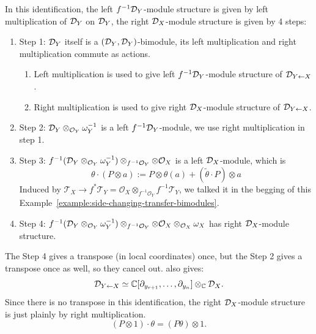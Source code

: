 \begin{example}
\begin{enumerate}
              In this identification, the left $f^{-1}\mathcal{D}_Y$-module structure is given by left multiplication of $\mathcal{D}_Y$ on $\mathcal{D}_Y$, the right $\mathcal{D}_X$-module structure is given by 4 steps:
              \begin{enumerate}
                  \item Step 1: $\mathcal{D}_Y$ itself is a $(\mathcal{D}_Y, \mathcal{D}_Y)$-bimodule, its left multiplication and right multiplication commute as actions.
                        \begin{enumerate}
                            \item Left multiplication is used to give left $f^{-1}\mathcal{D}_Y$-module structure of $\mathcal{D}_{Y\leftarrow X}$.
                            \item Right multiplication is used to give right $\mathcal{D}_X$-module structure of $\mathcal{D}_{Y\leftarrow X}$.
                        \end{enumerate}
                  \item Step 2: $\mathcal{D}_Y \otimes_{\mathcal O_Y} \omega_Y^{-1}$ is a left $f^{-1}\mathcal{D}_Y$-module, we use right multiplication in step 1.
                  \item Step 3: $f^{-1} (\mathcal{D}_Y \otimes_{\mathcal O_Y} \omega_Y^{-1}) \otimes_{f^{-1}\mathcal O_Y} \otimes \mathcal O_X$ is a left $\mathcal{D}_X$-module, which is
                        \[
                            \theta \cdot (P \otimes a) :=  P \otimes \theta(a) +  (\widetilde{\theta} \cdot P) \otimes a
                        \]
                        Induced by $\mathcal{T}_X \to f^*\mathcal{T}_Y = \mathcal{O}_X \otimes_{f^{-1}\mathcal{O}_Y} f^{-1}\mathcal{T}_Y$,
                        we talked it in the begging of this Example~\ref{example:side-changing-transfer-bimodules}.
                  \item Step 4: $f^{-1} (\mathcal{D}_Y \otimes_{\mathcal O_Y} \omega_Y^{-1}) \otimes_{f^{-1}\mathcal O_Y} \otimes \mathcal O_X \otimes_{\mathcal O_X} \omega_X$ has right $\mathcal{D}_X$-module structure.
              \end{enumerate}
              The Step 4 gives a transpose (in local coordinates) once, but the Step 2 gives a transpose once as well, so they cancel out. \cite{hotta2008d} also gives:
              \[
                  \mathcal{D}_{Y\leftarrow X} \simeq \mathbb{C}[\partial_{y_{r+1}}, \dots, \partial_{y_n}] \otimes_{\mathbb{C}} \mathcal{D}_X.
              \]
              Since there is no transpose in this identification, the right $\mathcal{D}_X$-module structure is just plainly by right multiplication.
              \[
                  (P\otimes 1)\cdot \theta =  (P\theta)\otimes 1.
              \]
    \end{enumerate}

\end{example}
